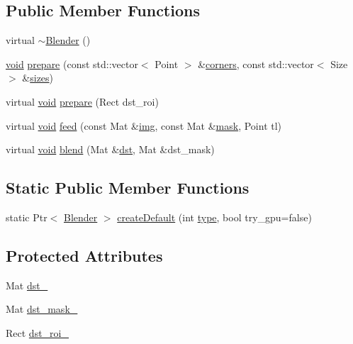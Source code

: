 \subsection*{Public Member Functions}
\begin{DoxyCompactItemize}
\item 
virtual \hyperlink{classcv_1_1detail_1_1Blender_aaed7672217c000c9b2113d37405b0bb5}{$\sim$\-Blender} ()
\item 
\hyperlink{legacy_8hpp_a8bb47f092d473522721002c86c13b94e}{void} \hyperlink{classcv_1_1detail_1_1Blender_aa6aa12e142c0ae01ac7964ca82fd0757}{prepare} (const std\-::vector$<$ Point $>$ \&\hyperlink{imgproc__c_8h_a223e965e192c7025d6c6be77305f515b}{corners}, const std\-::vector$<$ Size $>$ \&\hyperlink{imgproc__c_8h_afcc291f06aa904173ea1ada4741707f6}{sizes})
\item 
virtual \hyperlink{legacy_8hpp_a8bb47f092d473522721002c86c13b94e}{void} \hyperlink{classcv_1_1detail_1_1Blender_a6d81cd6a0a2284de3ec7898409c7c0a8}{prepare} (Rect dst\-\_\-roi)
\item 
virtual \hyperlink{legacy_8hpp_a8bb47f092d473522721002c86c13b94e}{void} \hyperlink{classcv_1_1detail_1_1Blender_a48285084faa1686d8ddcf8faa0d53ad0}{feed} (const Mat \&\hyperlink{legacy_8hpp_a5349238b3772bed6eae0fda3117ccfef}{img}, const Mat \&\hyperlink{tracking_8hpp_a6b13ecd2fd6ec7ad422f1d7863c3ad19}{mask}, Point tl)
\item 
virtual \hyperlink{legacy_8hpp_a8bb47f092d473522721002c86c13b94e}{void} \hyperlink{classcv_1_1detail_1_1Blender_aa7f395032fff97cb5d058388568006a8}{blend} (Mat \&\hyperlink{photo__c_8h_aed13e2a25279b24dc954073233fef7a5}{dst}, Mat \&dst\-\_\-mask)
\end{DoxyCompactItemize}
\subsection*{Static Public Member Functions}
\begin{DoxyCompactItemize}
\item 
static Ptr$<$ \hyperlink{classcv_1_1detail_1_1Blender}{Blender} $>$ \hyperlink{classcv_1_1detail_1_1Blender_ae5102a5ed5866711ba0e8347576307eb}{create\-Default} (int \hyperlink{imgproc__c_8h_a84612d8738bf935200cf32a103d8efe1}{type}, bool try\-\_\-gpu=false)
\end{DoxyCompactItemize}
\subsection*{Protected Attributes}
\begin{DoxyCompactItemize}
\item 
Mat \hyperlink{classcv_1_1detail_1_1Blender_abc7f2731625ea5d890847a905648667d}{dst\-\_\-}
\item 
Mat \hyperlink{classcv_1_1detail_1_1Blender_a6dae09b144daeb3e81b6571b253ae08a}{dst\-\_\-mask\-\_\-}
\item 
Rect \hyperlink{classcv_1_1detail_1_1Blender_a2d4bafbbb6dd7e87882bf88128bdd92f}{dst\-\_\-roi\-\_\-}
\end{DoxyCompactItemize}


